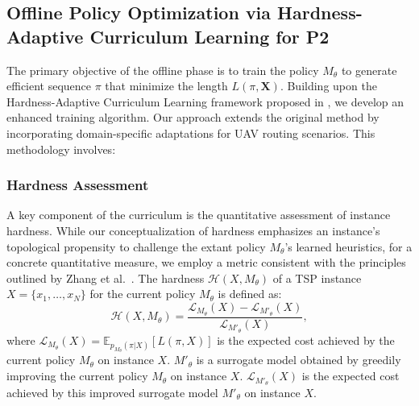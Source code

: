 \documentclass[10pt,conference,letterpaper]{IEEEtran}
\begin{document}
\subsection{Offline Policy Optimization via Hardness-Adaptive Curriculum Learning for P2}

The primary objective of the offline phase is to train the policy $M_{\theta}$ to generate efficient sequence $\pi$ that minimize the length $L(\pi, \mathbf{X})$. Building upon the Hardness-Adaptive Curriculum Learning framework proposed in  \cite{DBLP:conf/aaai/ZhangZW022}, we develop an enhanced training algorithm. Our approach extends the original method by incorporating domain-specific adaptations for UAV routing scenarios. This methodology involves:
\subsubsection{Hardness Assessment} 
A key component of the curriculum is the quantitative assessment of instance hardness.
While our conceptualization of hardness emphasizes an instance's topological propensity to challenge the extant policy $M_{\theta}$'s learned heuristics, for a concrete quantitative measure, we employ a metric consistent with the principles outlined by Zhang et al.~\cite{DBLP:conf/aaai/ZhangZW022}.
The hardness $\mathcal{H}(X, M_{\theta})$ of a TSP instance $X = \{x_1, \dots, x_N\}$ for the current policy $M_{\theta}$ is defined as:
\begin{equation}
\mathcal{H}(X, M_{\theta}) = \frac{\mathcal{L}_{M_{\theta}}(X) - \mathcal{L}_{M'_{\theta}}(X)}{\mathcal{L}_{M'_{\theta}}(X)},
\label{eq:hardness_metric}
\end{equation}
where $\mathcal{L}_{M_{\theta}}(X) = \mathbb{E}_{p_{M_{\theta}}(\pi|X)}[L(\pi, X)]$ is the expected cost achieved by the current policy $M_{\theta}$ on instance $X$. $M'_{\theta}$ is a surrogate model obtained by greedily improving the current policy $M_{\theta}$ on instance $X$. $\mathcal{L}_{M'_{\theta}}(X)$ is the expected cost achieved by this improved surrogate model $M'_{\theta}$ on instance $X$.

\end{document}
